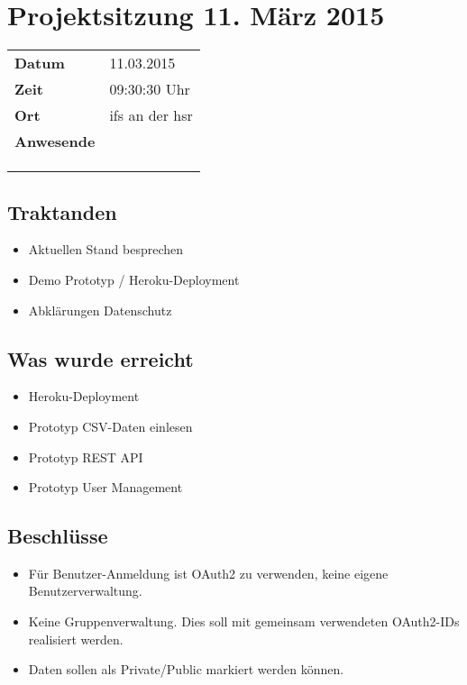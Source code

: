 \documentclass[class=scrbook,crop=false]{standalone}
\begin{document}
	
	\section{Projektsitzung 11. März 2015}
	
	\begin{tabular}{ll}
		\textbf{Datum} & 11.03.2015 \\
		\textbf{Zeit} & 09:30\textendash10:30 Uhr \\
		\textbf{Ort} & \acs{ifs} an der \acs{hsr} \\
		\textbf{Anwesende} & \proff \\ & \chuf \\ & \rlif \\ & \fscf
	\end{tabular}
	

	\subsection*{Traktanden}
	\begin{itemize}
		\item Aktuellen Stand besprechen
		\item Demo Prototyp / Heroku-Deployment
		\item Abklärungen Datenschutz
	\end{itemize}
	
	\subsection*{Was wurde erreicht}
	\begin{itemize}
		\item Heroku-Deployment
		\item Prototyp CSV-Daten einlesen
		\item Prototyp REST API
		\item Prototyp User Management
	\end{itemize}
	
	\subsection*{Beschlüsse}
	\begin{itemize}
		\item Für Benutzer-Anmeldung ist OAuth2 zu verwenden, keine eigene Benutzerverwaltung.
		\item Keine Gruppenverwaltung. Dies soll mit gemeinsam verwendeten OAuth2-IDs realisiert werden.
		\item Daten sollen als Private/Public markiert werden können.
	\end{itemize}
	
\end{document}
